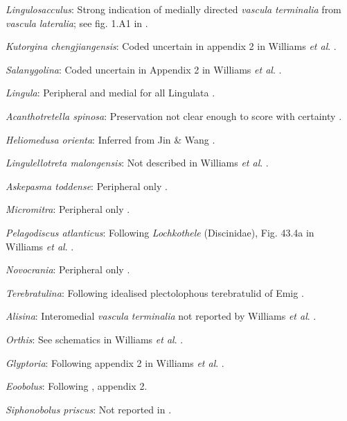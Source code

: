 \documentclass[]{book}
\theoremstyle{definition}
\theoremstyle{definition}
\theoremstyle{definition}
\theoremstyle{remark}
\begin{document}
\emph{Lingulosacculus}: Strong indication of medially directed
\emph{vascula} \emph{terminalia} from \emph{vascula} \emph{lateralia};
see fig. 1.A1 in \citet{Balthasar2009EarlyCambrian}.

\emph{Kutorgina chengjiangensis}: Coded uncertain in appendix 2 in
Williams \emph{et al}. \citeyearpar{Williams1998Thediversity}.

\emph{Salanygolina}: Coded uncertain in Appendix 2 in Williams \emph{et
al}. \citeyearpar{Williams1998Thediversity}.

\emph{Lingula}: Peripheral and medial for all Lingulata
\citep{Williams2000BrachiopodaLinguliformea}.

\emph{Acanthotretella spinosa}: Preservation not clear enough to score
with certainty \citep{Holmer2006Aspinose}.

\emph{Heliomedusa orienta}: Inferred from Jin \& Wang
\citeyearpar{Jin1992Revisionof}.

\emph{Lingulellotreta malongensis}: Not described in Williams \emph{et
al}. \citeyearpar{Williams2000BrachiopodaLinguliformea}.

\emph{Askepasma toddense}: Peripheral only
\citep{Williams1998Thediversity, Williams2000BrachiopodaLinguliformea}.

\emph{Micromitra}: Peripheral only
\citep{Williams1998Thediversity, Williams2000BrachiopodaLinguliformea}.

\emph{Pelagodiscus atlanticus}: Following \emph{Lochkothele}
(Discinidae), Fig. 43.4a in Williams \emph{et al}.
\citeyearpar{Williams2000BrachiopodaLinguliformea}.

\emph{Novocrania}: Peripheral only
\citep[p.158]{Williams2000BrachiopodaLinguliformea}.

\emph{Terebratulina}: Following idealised plectolophous terebratulid of
Emig \citeyearpar{Emig1992Functionaldisposition}.

\emph{Alisina}: Interomedial \emph{vascula} \emph{terminalia} not
reported by Williams \emph{et al}.
\citeyearpar{Williams2000BrachiopodaLinguliformea}.

\emph{Orthis}: See schematics in Williams \emph{et al}.
\citeyearpar{Williams2000BrachiopodaLinguliformea}.

\emph{Glyptoria}: Following appendix 2 in Williams \emph{et al}.
\citeyearpar{Williams1998Thediversity}.

\emph{Eoobolus}: Following \citet{Williams1998Thediversity}, appendix 2.

\emph{Siphonobolus priscus}: Not reported in
\citet{Williams2000BrachiopodaLinguliformea}.
\end{document}
